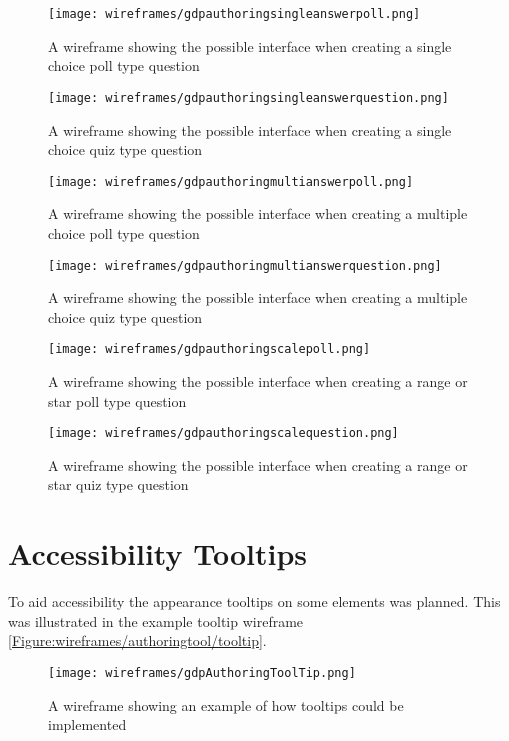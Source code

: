 \begin{figure}
	\centering
	\texttt{[image: wireframes/gdpauthoringsingleanswerpoll.png]}
	\caption{A wireframe showing the possible interface when creating a single choice poll type question}
	\label{Figure:wireframes/authoringtool/singlePoll}
\end{figure}

\begin{figure}
	\centering
	\texttt{[image: wireframes/gdpauthoringsingleanswerquestion.png]}
	\caption{A wireframe showing the possible interface when creating a single choice quiz type question}
	\label{Figure:wireframes/authoringtool/singleQuiz}
\end{figure}

\begin{figure}
	\centering
	\texttt{[image: wireframes/gdpauthoringmultianswerpoll.png]}
	\caption{A wireframe showing the possible interface when creating a multiple choice poll type question}
	\label{Figure:wireframes/authoringtool/multiPoll}
\end{figure}

\begin{figure}
	\centering
	\texttt{[image: wireframes/gdpauthoringmultianswerquestion.png]}
	\caption{A wireframe showing the possible interface when creating a multiple choice quiz type question}
	\label{Figure:wireframes/authoringtool/multiQuiz}
\end{figure}

\begin{figure}
	\centering
	\texttt{[image: wireframes/gdpauthoringscalepoll.png]}
	\caption{A wireframe showing the possible interface when creating a range or star poll type question}
	\label{Figure:wireframes/authoringtool/rangeStarPoll}
\end{figure}


\begin{figure}
	\centering
	\texttt{[image: wireframes/gdpauthoringscalequestion.png]}
	\caption{A wireframe showing the possible interface when creating a range or star quiz type question}
	\label{Figure:wireframes/authoringtool/rangeStarQuiz}
\end{figure}

\section{Accessibility Tooltips}

To aid accessibility the appearance tooltips on some elements was planned. This was illustrated in the example tooltip wireframe \autoref{Figure:wireframes/authoringtool/tooltip}.

\begin{landscape}
\begin{figure}
	\centering
	\texttt{[image: wireframes/gdpAuthoringToolTip.png]}
	\caption{A wireframe showing an example of how tooltips could be implemented}
	\label{Figure:wireframes/authoringtool/tooltip}
\end{figure}
\end{landscape}